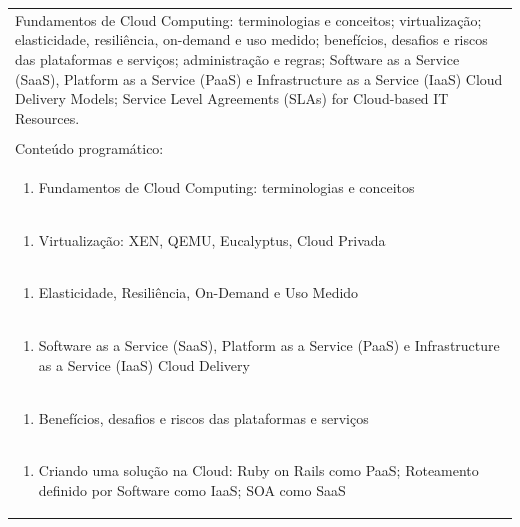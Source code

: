\documentclass[11pt]{article}
\begin{document}
\begin{center}
\begin{longtable}{|p{4cm}|p{4cm}|p{4cm}|p{4cm}|}
\multicolumn{4}{|p{\dimexpr 16cm + 6\tabcolsep\relax}|}{Fundamentos de Cloud Computing: terminologias e conceitos; virtualização; elasticidade, resiliência, on-demand e uso medido; benefícios, desafios e riscos das plataformas e serviços; administração e regras; Software as a Service (SaaS), Platform as a Service (PaaS) e Infrastructure as a Service (IaaS) Cloud Delivery Models; Service Level Agreements (SLAs) for Cloud-based IT Resources.}\\
\multicolumn{4}{|p{16cm}|}{}\\
\hline
\multicolumn{4}{|p{16cm}|}{Conteúdo programático:}\\*
\multicolumn{4}{|p{\dimexpr 16cm + 6\tabcolsep\relax}|}{\begin{enumerate}[start=1]\item Fundamentos de Cloud Computing: terminologias e conceitos\end{enumerate}}\\
\multicolumn{4}{|p{\dimexpr 16cm + 6\tabcolsep\relax}|}{\begin{enumerate}[start=2]\item Virtualização: XEN, QEMU, Eucalyptus, Cloud Privada\end{enumerate}}\\
\multicolumn{4}{|p{\dimexpr 16cm + 6\tabcolsep\relax}|}{\begin{enumerate}[start=3]\item Elasticidade, Resiliência, On-Demand e Uso Medido\end{enumerate}}\\
\multicolumn{4}{|p{\dimexpr 16cm + 6\tabcolsep\relax}|}{\begin{enumerate}[start=4]\item Software as a Service (SaaS), Platform as a Service (PaaS) e Infrastructure as a Service (IaaS) Cloud Delivery\end{enumerate}}\\
\multicolumn{4}{|p{\dimexpr 16cm + 6\tabcolsep\relax}|}{\begin{enumerate}[start=5]\item Benefícios, desafios e riscos das plataformas e serviços\end{enumerate}}\\
\multicolumn{4}{|p{\dimexpr 16cm + 6\tabcolsep\relax}|}{\begin{enumerate}[start=6]\item Criando uma solução na Cloud: Ruby on Rails como PaaS; Roteamento definido por Software como IaaS; SOA como SaaS\end{enumerate}}\\

\end{longtable}
\end{center}
\end{document}
